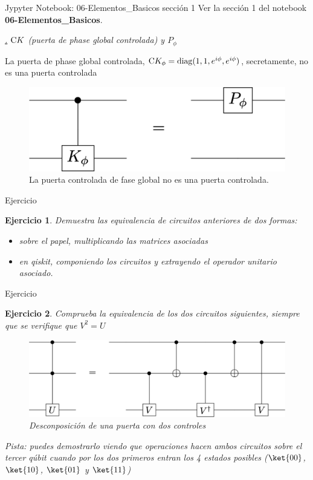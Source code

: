 \documentclass[a4paper,11pt]{book} %
\newtheorem{ejercicio_contador}{Ejercicio}
\newcommand{\Ejercicio}[1]{
		\begin{mybox_gray}{Ejercicio} 
			\begin{ejercicio_contador}
				 #1 
			\end{ejercicio_contador} 
		\end{mybox_gray}
	}
\numberwithin{equation}{chapter}
\newcommand{\cg}[1]{{\rm C}#1}
\def\subsubiContadorIt{\par\addtocounter{subsubsection}{1}\underline{\it\thesubsubsection.}\hskip0.5cm \setcounter{subsubsubsectionIt}{0}}
\newcommand{\SubsubiIt}[1]{
		\subsubiContadorIt \textit{#1}
	}
\newcounter{subsubsubsectionIt}[subsubsection]
\begin{document}
	\begin{mybox_orange}{Jypyter Notebook: 06-Elementos\_Basicos sección 1}
	Ver la sección 1 del notebook \textbf{06-Elementos\_Basicos}.
	\end{mybox_orange}



			\SubsubiIt{$\cg{K}$ (puerta de phase global controlada) y $P_\phi$}

La puerta de phase global controlada, $\cg{K_\phi} = {\rm diag} (1,1,e^{i\phi}, e^{i\phi})$, secretamente, no es una puerta controlada
	\begin{figure}[H]
	\centering 
	\includegraphics[width=0.35\linewidth]{Figuras/Fig_elementos_Equiv_Kphase}
	\caption{La puerta controlada de fase global no es una puerta controlada.}
	\label{Fig_elementos_Equiv_Kphase}
	\end{figure}



	\Ejercicio{Demuestra las equivalencia de circuitos anteriores de dos formas:
	\begin{itemize}
		\item[a)] sobre el papel,  multiplicando las matrices asociadas
		\item[b)] en qiskit, componiendo los circuitos y extrayendo el operador unitario asociado.
	\end{itemize}
	}
	
	\Ejercicio{Comprueba la equivalencia de los dos circuitos siguientes, siempre que se verifique que $V^2 = U$
		\begin{figure}[H]
		\centering 
		\includegraphics[width=0.60\linewidth]{Figuras/Fig_elementos_CCUdecomposition}
		\caption{Desconposición de una puerta con dos controles}
		\label{Fig_elementos_CCUdecomposition}
		\end{figure}
	Pista: puedes demostrarlo viendo que operaciones hacen ambos circuitos sobre el tercer qúbit cuando por los dos
	primeros entran los 4 estados posibles ($\ket{00}$, $\ket{10}$, $\ket{01}$ y $\ket{11}$)
	}		
	
\end{document}
